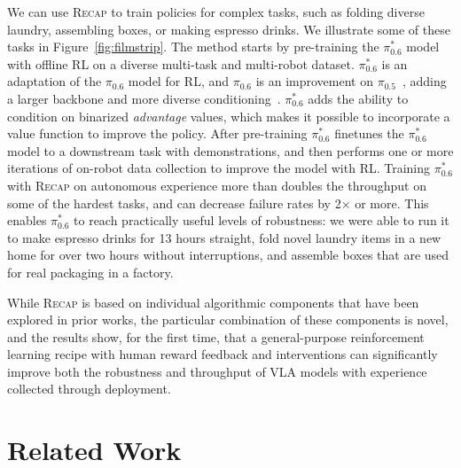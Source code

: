 \documentclass[conference]{IEEEtran}
\def \Pizf {$\pi_{0.5}$}
\def \Pizs {$\pi_{0.6}$}
\def \ModelSymbol {$\pi^{*}_{0.6}$}
\def \MethodName {\textsc{Recap}}
\def \MethodSymbol {$\pi^{*}_{0.6}$}
\begin{document}
We can use \MethodName{} to train policies for complex tasks, such as folding diverse laundry, assembling boxes, or making espresso drinks. We illustrate some of these tasks in Figure~\ref{fig:filmstrip}. The method starts by pre-training the \ModelSymbol{} model with offline RL on a diverse multi-task and multi-robot dataset. \MethodSymbol{} is an adaptation of the \Pizs{} model for RL, and \Pizs{} is an improvement on \Pizf{}~\citep{black2025pi05}, adding a larger backbone and more diverse conditioning~\citep{pi06model}. \ModelSymbol{} adds the ability to condition on binarized \emph{advantage} values, which makes it possible to incorporate a value function to improve the policy. After pre-training \MethodSymbol{} finetunes the \ModelSymbol{} model to a downstream task with demonstrations, and then performs one or more iterations of on-robot data collection to improve the model with RL. Training \ModelSymbol{} with \MethodName{} on autonomous experience more than doubles the throughput on some of the hardest tasks, and can decrease failure rates by 2$\times$ or more. This enables \ModelSymbol{} to reach practically useful levels of robustness: we were able to run it to make espresso drinks for 13 hours straight, fold novel laundry items in a new home for over two hours without interruptions, and assemble boxes that are used for real packaging in a factory.

While \MethodName{} is based on individual algorithmic components that have been explored in prior works, the particular combination of these components is novel, and the results show, for the first time, that a general-purpose reinforcement learning recipe with human reward feedback and interventions can significantly improve both the robustness and throughput of VLA models with experience collected through deployment.

\section{Related Work}
\end{document}

